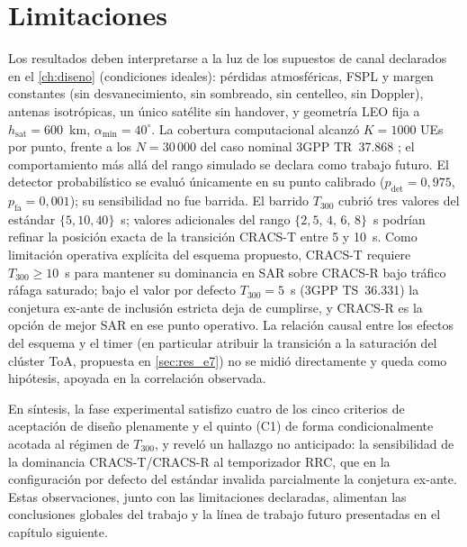 \section{Limitaciones}
\label{sec:res_limitaciones}

Los resultados deben interpretarse a la luz de los supuestos de canal declarados en el \cref{ch:diseno} (condiciones ideales): pérdidas atmosféricas, FSPL y margen constantes (sin desvanecimiento, sin sombreado, sin centelleo, sin Doppler), antenas isotrópicas, un único satélite sin handover, y geometría LEO fija a $h_{\text{sat}}=600$~km, $\alpha_{\min}=40^\circ$. La cobertura computacional alcanzó $K=1000$ UEs por punto, frente a los $N=30\,000$ del caso nominal 3GPP TR~37.868 \cite{ref20}; el comportamiento más allá del rango simulado se declara como trabajo futuro. El detector probabilístico se evaluó únicamente en su punto calibrado ($p_{\text{det}}=0{,}975$, $p_{\text{fa}}=0{,}001$); su sensibilidad no fue barrida. El barrido $T_{300}$ cubrió tres valores del estándar $\{5, 10, 40\}$~s; valores adicionales del rango $\{2{,}5,\, 4,\, 6,\, 8\}$~s podrían refinar la posición exacta de la transición CRACS-T entre 5 y 10~s. Como limitación operativa explícita del esquema propuesto, CRACS-T requiere $T_{300} \geq 10$~s para mantener su dominancia en SAR sobre CRACS-R bajo tráfico ráfaga saturado; bajo el valor por defecto $T_{300}=5$~s (3GPP TS~36.331) la conjetura ex-ante de inclusión estricta deja de cumplirse, y CRACS-R es la opción de mejor SAR en ese punto operativo. La relación causal entre los efectos del esquema y el timer (en particular atribuir la transición a la saturación del clúster ToA, propuesta en \cref{sec:res_e7}) no se midió directamente y queda como hipótesis, apoyada en la correlación observada.

\label{sec:res_cierre}
En síntesis, la fase experimental satisfizo cuatro de los cinco criterios de aceptación de diseño plenamente y el quinto (C1) de forma condicionalmente acotada al régimen de $T_{300}$, y reveló un hallazgo no anticipado: la sensibilidad de la dominancia CRACS-T/CRACS-R al temporizador RRC, que en la configuración por defecto del estándar invalida parcialmente la conjetura ex-ante. Estas observaciones, junto con las limitaciones declaradas, alimentan las conclusiones globales del trabajo y la línea de trabajo futuro presentadas en el capítulo siguiente.
